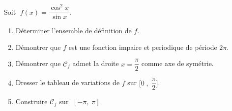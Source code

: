  \begin{exercice}

Soit  $ \;f(x)=\dfrac{\cos^2 x}{\sin x} $.
 \begin{enumerate}
 \item Déterminer  l'ensemble de définition de $ f $.
 \item Démontrer que $ f $ est une fonction impaire et periodique de période $ 2\pi $.
 \item Démontrer  que  $ \mathcal{C}_{f} $  admet la droite $ x=\dfrac{\pi}{2} $ comme axe  de symétrie.
 \item Dresser  le tableau de variations  de $ f$ sur $\bigl[0\; ,\;\dfrac{\pi}{2}\bigr] $.
 \item Construire $ \mathcal{C}_{f} $  sur  $ \;[-\pi,\; \pi] $.
 \end{enumerate}
    
\end{exercice}

 


